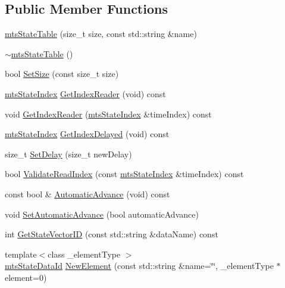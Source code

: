\subsection*{Public Member Functions}
\begin{DoxyCompactItemize}
\item 
\hyperlink{classmts_state_table_ae954ad47082d48f3f8e714afad5a9767}{mts\-State\-Table} (size\-\_\-t size, const std\-::string \&name)
\item 
\hyperlink{classmts_state_table_a03c3835c43941a57d66505abd2f05322}{$\sim$mts\-State\-Table} ()
\item 
bool \hyperlink{classmts_state_table_a136f4ad7e8d6dfab270986ce47295fd5}{Set\-Size} (const size\-\_\-t size)
\item 
\hyperlink{classmts_state_index}{mts\-State\-Index} \hyperlink{classmts_state_table_af4901ad205b88d098b6ee97b59af16a4}{Get\-Index\-Reader} (void) const 
\item 
void \hyperlink{classmts_state_table_afa402569cbba5a992f73af46949f6b8e}{Get\-Index\-Reader} (\hyperlink{classmts_state_index}{mts\-State\-Index} \&time\-Index) const 
\item 
\hyperlink{classmts_state_index}{mts\-State\-Index} \hyperlink{classmts_state_table_a459a5d0de87163c2a165f8d6fa8c31eb}{Get\-Index\-Delayed} (void) const 
\item 
size\-\_\-t \hyperlink{classmts_state_table_a6cebcf5b3e058c869bf4b4c34f499b4b}{Set\-Delay} (size\-\_\-t new\-Delay)
\item 
bool \hyperlink{classmts_state_table_a6b92270e56f337ee1fa769ff42c5eee4}{Validate\-Read\-Index} (const \hyperlink{classmts_state_index}{mts\-State\-Index} \&time\-Index) const 
\item 
const bool \& \hyperlink{classmts_state_table_a51b9fa57c462ae00bcdaaf1c62c54607}{Automatic\-Advance} (void) const 
\item 
void \hyperlink{classmts_state_table_a3ece77254c327aabfed28607e42dc71c}{Set\-Automatic\-Advance} (bool automatic\-Advance)
\item 
int \hyperlink{classmts_state_table_a0ae9b9c0b7eab66ebfcc93550ab3f83d}{Get\-State\-Vector\-I\-D} (const std\-::string \&data\-Name) const 
\item 
{\footnotesize template$<$class \-\_\-element\-Type $>$ }\\\hyperlink{mts_state_table_8h_ac3a0e34e8991d51790b043fa01857a35}{mts\-State\-Data\-Id} \hyperlink{classmts_state_table_afb91c059336258d4d2c0093051a8a7dd}{New\-Element} (const std\-::string \&name=\char`\"{}\char`\"{}, \-\_\-element\-Type $\ast$element=0)

\end{DoxyCompactItemize}
